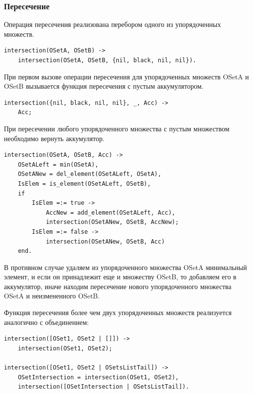 		\subsubsection{Пересечение}
			Операция пересечения реализована перебором одного из упорядоченных множеств.
			\begin{lstlisting}
intersection(OSetA, OSetB) ->
    intersection(OSetA, OSetB, {nil, black, nil, nil}).
			\end{lstlisting}
			При первом вызове операции пересечения для упорядоченных множеств OSetA и OSetB
			вызывается функция пересечения с пустым аккумулятором.
			\begin{lstlisting}	
intersection({nil, black, nil, nil}, _, Acc) ->
    Acc;
			\end{lstlisting}
			При пересечении любого упорядоченного множества с пустым множеством необходимо вернуть аккумулятор.
			\begin{lstlisting}	
intersection(OSetA, OSetB, Acc) ->
    OSetALeft = min(OSetA),
    OSetANew = del_element(OSetALeft, OSetA),
    IsElem = is_element(OSetALeft, OSetB),
    if 
        IsElem =:= true -> 
            AccNew = add_element(OSetALeft, Acc),
            intersection(OSetANew, OSetB, AccNew);
        IsElem =:= false -> 
            intersection(OSetANew, OSetB, Acc)
    end.
			\end{lstlisting}
			В противном случае удаляем из упорядоченного множества OSetA минимальный элемент, и если он 
			принадлежит еще и множеству OSetB, то добавляем его в аккумулятор, иначе находим пересечение 
			нового упорядоченного множества OSetA и неизмененного OSetB.
			
			Функция пересечения более чем двух упорядоченных множеств реализуется аналогично с объединением:
			\begin{lstlisting}
intersection([OSet1, OSet2 | []]) ->
    intersection(OSet1, OSet2);

intersection([OSet1, OSet2 | OSetsListTail]) ->
    OSetIntersection = intersection(OSet1, OSet2),
    intersection([OSetIntersection | OSetsListTail]).
			\end{lstlisting}
			
